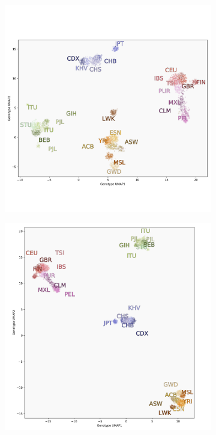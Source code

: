 \documentclass[12pt]{article}
\begin{document}
\begin{figure}[h!]
  \centering
  \begin{subfigure}[b]{0.49\linewidth}
    \includegraphics[width=\linewidth]{code/images/1KGP_genotype_UMAP_low_NN.png}
    \caption{}
    \label{fig:UMAP_low_NN_1KGP}
  \end{subfigure}
  \begin{subfigure}[b]{0.49\linewidth}
    \includegraphics[width=\linewidth]{code/images/1KGP_genotype_UMAP_high_NN.png}

\end{subfigure}
\end{figure}
\end{document}
